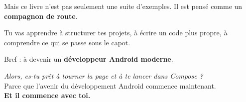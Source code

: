 \noindent Mais ce livre n’est pas seulement une suite d’exemples.  
Il est pensé comme un \textbf{compagnon de route}.  

Tu vas apprendre à structurer tes projets, à écrire un code plus propre, à comprendre ce qui se passe sous le capot.  

Bref : à devenir un \textbf{développeur Android moderne}.  

\vspace{0.5em}
\begin{center}
\textit{Alors, es-tu prêt à tourner la page et à te lancer dans Compose ?}\\
Parce que l’avenir du développement Android commence maintenant.\\
\textbf{Et il commence avec toi.}
\end{center}

